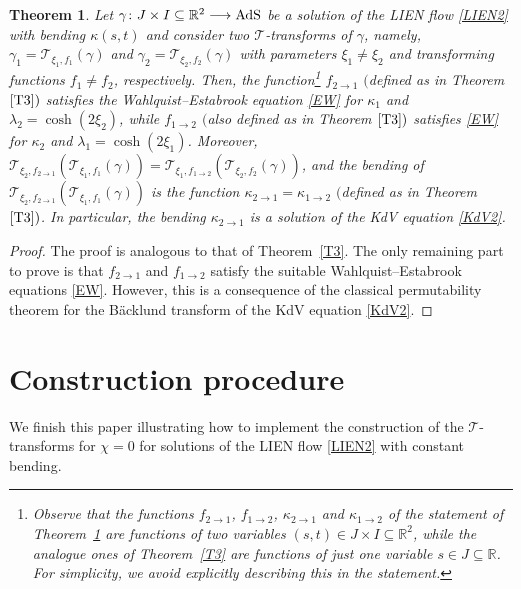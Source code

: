 \documentclass[10pt,a4paper]{amsart}
\numberwithin{equation}{section}
\newtheorem{Theorem}{Theorem}[section]
\def\bending{\kappa}
\def\R{\mathbb{R}}
\def\AdS{{\rm AdS}}
\begin{document}
\begin{Theorem}\label{5.13} Let $\gamma\colon J\times I\subseteq\R^2\longrightarrow\AdS$ be a solution of the LIEN flow \eqref{LIEN2} with bending $\bending(s,t)$ and consider two $\mathcal{T}$-transforms of $\gamma$, namely, $\gamma_1=\mathcal{T}_{\xi_1,f_1}(\gamma)$ and $\gamma_2=\mathcal{T}_{\xi_2,f_2}(\gamma)$ with parameters $\xi_1\neq \xi_2$ and transforming functions $f_1\neq f_2$, respectively. Then, the function\footnote{Observe that the functions $f_{2\to 1}$, $f_{1\to 2}$, $\bending_{2\to 1}$ and $\bending_{1\to 2}$ of the statement of Theorem~\ref{5.13} are functions of two variables $(s,t)\in J\times I\subseteq\R^2$, while the analogue ones of Theorem~\ref{T3} are functions of just one variable $s\in J\subseteq\R$. For simplicity, we avoid explicitly describing this in the statement.} $f_{2\to 1}$ $($defined as in Theorem $\ref{T3})$ satisfies the Wahlquist--Estabrook equation \eqref{EW} for $\bending_1$ and $\lambda_2=\cosh(2\xi_2)$, while $f_{1\to 2}$ $($also defined as in Theorem $\ref{T3})$ satisfies \eqref{EW} for $\bending_2$ and $\lambda_1=\cosh(2\xi_1)$. Moreover,
$\mathcal{T}_{\xi_2,f_{2\to 1}}(\mathcal{T}_{\xi_1,f_1}(\gamma))=\mathcal{T}_{\xi_1,f_{1\to 2}}(\mathcal{T}_{\xi_2,f_2}(\gamma))$,
	and the bending of $\mathcal{T}_{\xi_2,f_{2\to 1}}(\mathcal{T}_{\xi_1,f_1}(\gamma))$ is the function $\bending_{2\to 1}=\bending_{1\to 2}$ $($defined as in Theorem $\ref{T3})$. In particular, the bending $\bending_{2\to 1}$ is a solution of the KdV equation \eqref{KdV2}.
\end{Theorem}
\begin{proof}
	The proof is analogous to that of Theorem~\ref{T3}. The only remaining part to prove is that $f_{2\to 1}$ and $f_{1\to 2}$ satisfy the suitable Wahlquist--Estabrook equations \eqref{EW}. However, this is a consequence of the classical permutability theorem for the B\"{a}cklund transform of the KdV equation \eqref{KdV2}.
\end{proof}

\section{Construction procedure}\label{section5}

We finish this paper illustrating how to implement the construction of the $\mathcal{T}$-transforms for $\chi=0$ for solutions of the LIEN flow \eqref{LIEN2} with constant bending.
\end{document}
